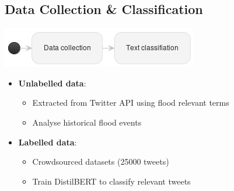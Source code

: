 \documentclass{beamer}
\begin{document}
\subsection{Data Collection \& Classification}
\begin{frame}[t]

  \includegraphics[scale=0.4]{./images/p1.png}

  \begin{itemize}

    \item \textbf{Unlabelled data}: 
      \begin{itemize}
    \item Extracted from Twitter API using flood relevant terms 
    \item Analyse historical flood events
      \end{itemize}
    \item \textbf{Labelled data}:  
      \begin{itemize}
        \item Crowdsourced datasets  (25000 tweets)
        \item Train DistilBERT to classify relevant tweets
      \end{itemize}
  \end{itemize}
\end{frame}
\end{document}
